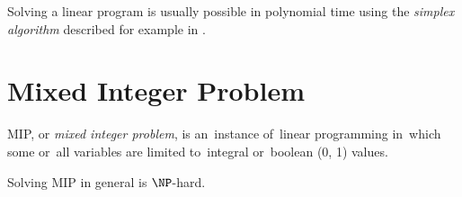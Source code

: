 Solving a linear program is usually possible in polynomial time using the \textit{simplex algorithm} described for example in \cite{dantzig1998linear}.

\section{Mixed Integer Problem}


\begin{define}
	MIP, or \textit{mixed integer problem}, is an~instance of~linear programming in~which some or~all variables are limited to~integral or~boolean (0, 1) values.
\end{define}

Solving MIP in general is $\NP$-hard.